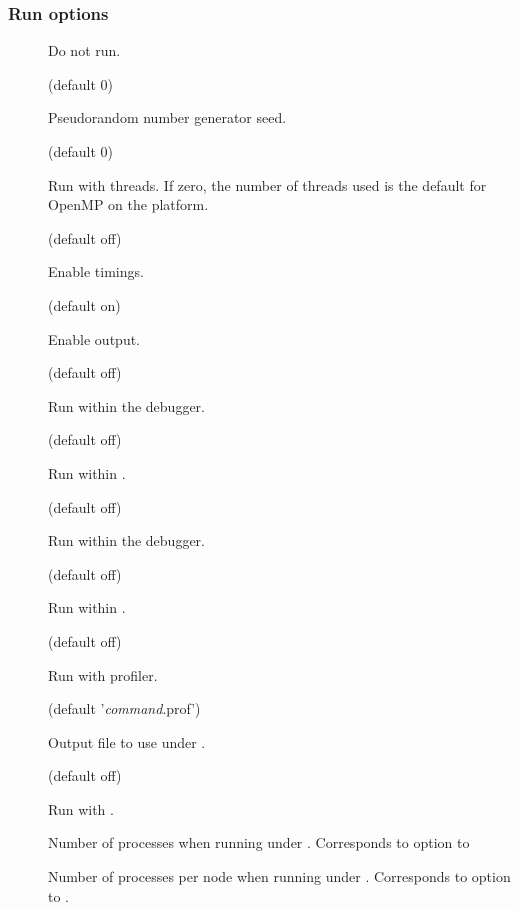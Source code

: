 \subsubsection{Run options}

\begin{description}
\item[]

Do not run.

\item[] (default 0)

Pseudorandom number generator seed.

\item[] (default 0)

Run with  threads. If zero, the number of threads used is the
default for OpenMP on the platform.

\item[] (default off)

Enable timings.

\item[] (default on)

Enable output.

\item[] (default off)

Run within the  debugger.

\item[] (default off)

Run within .

\item[] (default off)

Run within the  debugger.

\item[] (default off)

Run within .

\item[] (default off)

Run with  profiler.

\item[] (default '\textsl{command}.prof')

Output file to use under .

\item[] (default off)

Run with .

\item[]

Number of processes when running under . Corresponds to 
option to 

\item[]

Number of processes per node when running under . Corresponds to
 option to .

\end{description}

